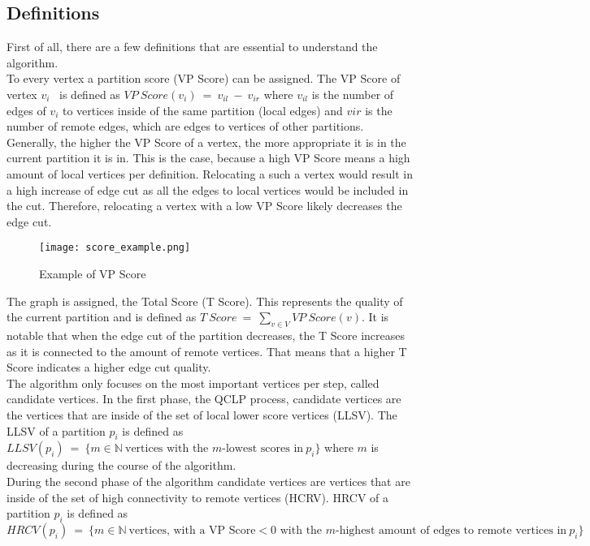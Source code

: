 \documentclass[acmsmall,nonacm,screen,review]{acmart}
\begin{document}
\subsection{Definitions}
First of all, there are a few definitions that are essential to understand the algorithm. \\
To every vertex a partition score (VP Score) can be assigned. The VP Score of vertex $v_{i}$ \ is defined as $VP\ Score(v_{i})\ =\ v_{il}\ -\ v_{ir}$ where $v_{il}$ is the number of edges of $v_{i}$ to vertices inside of the same partition (local edges) and $v{ir}$ is the number of remote edges, which are edges to vertices of other partitions. Generally, the higher the VP Score of a vertex, the more appropriate it is in the current partition it is in. This is the case, because a high VP Score means a high amount of local vertices per definition. Relocating a such a vertex would result in a high increase of edge cut as all the edges to local vertices would be included in the cut. Therefore, relocating a vertex with a low VP Score likely decreases the edge cut.\\
\begin{figure}[bt!]
\caption{Example of VP Score}
\label{vp_score}
\texttt{[image: score\_example.png]}
\end{figure}
The graph is assigned, the Total Score (T Score). This represents the quality of the current partition and is defined as $T\ Score\ =\ \sum_{v\in V} VP\ Score(v)$. It is notable that when the edge cut of the partition decreases, the T Score increases as it is connected to the amount of remote vertices. That means that a higher T Score indicates a higher edge cut quality.\\
The algorithm only focuses on the most important vertices per step, called candidate vertices. In the first phase, the QCLP process, candidate vertices are the vertices that are inside of the set of local lower score vertices (LLSV). The LLSV of a partition $p_{i}$ is defined as $LLSV(p_{i})\ =\ \{ m\in \mathbb{N}\ \text{vertices with the }m\text{-lowest scores in}\ p_{i}\}$ where $m$ is decreasing during the course of the algorithm. \\
During the second phase of the algorithm candidate vertices are vertices that are inside of the set of high connectivity to remote vertices (HCRV). HRCV of a partition $p_{i}$ is defined as 
$HRCV(p_{i})\ =\ \{m\in \mathbb{N}\ \text{vertices, with a VP Score} < 0 \text{ with the }m\text{-highest amount of edges to remote vertices in}\ p_{i}\}$
\end{document}
